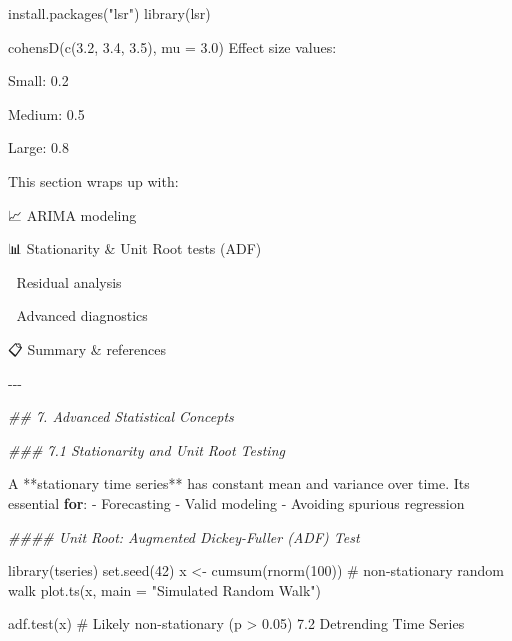 \documentclass[
  letterpaper,
  DIV=11,
  numbers=noendperiod]{scrreprt}
\newenvironment{Shaded}{\begin{snugshade}}{\end{snugshade}}
\newcommand{\AttributeTok}[1]{\textcolor[rgb]{0.40,0.45,0.13}{#1}}
\newcommand{\CommentTok}[1]{\textcolor[rgb]{0.37,0.37,0.37}{#1}}
\newcommand{\ControlFlowTok}[1]{\textcolor[rgb]{0.00,0.23,0.31}{\textbf{#1}}}
\newcommand{\DecValTok}[1]{\textcolor[rgb]{0.68,0.00,0.00}{#1}}
\newcommand{\DocumentationTok}[1]{\textcolor[rgb]{0.37,0.37,0.37}{\textit{#1}}}
\newcommand{\FloatTok}[1]{\textcolor[rgb]{0.68,0.00,0.00}{#1}}
\newcommand{\FunctionTok}[1]{\textcolor[rgb]{0.28,0.35,0.67}{#1}}
\newcommand{\NormalTok}[1]{\textcolor[rgb]{0.00,0.23,0.31}{#1}}
\newcommand{\OtherTok}[1]{\textcolor[rgb]{0.00,0.23,0.31}{#1}}
\newcommand{\SpecialCharTok}[1]{\textcolor[rgb]{0.37,0.37,0.37}{#1}}
\newcommand{\StringTok}[1]{\textcolor[rgb]{0.13,0.47,0.30}{#1}}
\begin{document}
{\begin{Shaded}
\begin{Highlighting}[]
\FunctionTok{install.packages}\NormalTok{(}\StringTok{"lsr"}\NormalTok{)}
\FunctionTok{library}\NormalTok{(lsr)}

\FunctionTok{cohensD}\NormalTok{(}\FunctionTok{c}\NormalTok{(}\FloatTok{3.2}\NormalTok{, }\FloatTok{3.4}\NormalTok{, }\FloatTok{3.5}\NormalTok{), }\AttributeTok{mu =} \FloatTok{3.0}\NormalTok{)}
\NormalTok{Effect size values}\SpecialCharTok{:}

\NormalTok{Small}\SpecialCharTok{:} \FloatTok{0.2}

\NormalTok{Medium}\SpecialCharTok{:} \FloatTok{0.5}

\NormalTok{Large}\SpecialCharTok{:} \FloatTok{0.8}

\NormalTok{This section wraps up with}\SpecialCharTok{:}

\NormalTok{📈 ARIMA modeling}

\NormalTok{📊 Stationarity }\SpecialCharTok{\&}\NormalTok{ Unit Root }\FunctionTok{tests}\NormalTok{ (ADF)}

\NormalTok{🧪 Residual analysis}

\NormalTok{🧠 Advanced diagnostics}

\NormalTok{📋 Summary }\SpecialCharTok{\&}\NormalTok{ references}

\SpecialCharTok{{-}{-}{-}}

\DocumentationTok{\#\# 7. Advanced Statistical Concepts}

\DocumentationTok{\#\#\# 7.1 Stationarity and Unit Root Testing}

\NormalTok{A }\SpecialCharTok{**}\NormalTok{stationary time series}\SpecialCharTok{**}\NormalTok{ has constant mean and variance over time. Its essential }\ControlFlowTok{for}\SpecialCharTok{:}
\SpecialCharTok{{-}}\NormalTok{ Forecasting}
\SpecialCharTok{{-}}\NormalTok{ Valid modeling}
\SpecialCharTok{{-}}\NormalTok{ Avoiding spurious regression}

\DocumentationTok{\#\#\#\# Unit Root: Augmented Dickey{-}Fuller (ADF) Test}

\FunctionTok{library}\NormalTok{(tseries)}
\FunctionTok{set.seed}\NormalTok{(}\DecValTok{42}\NormalTok{)}
\NormalTok{x }\OtherTok{\textless{}{-}} \FunctionTok{cumsum}\NormalTok{(}\FunctionTok{rnorm}\NormalTok{(}\DecValTok{100}\NormalTok{))  }\CommentTok{\# non{-}stationary random walk}
\FunctionTok{plot.ts}\NormalTok{(x, }\AttributeTok{main =} \StringTok{"Simulated Random Walk"}\NormalTok{)}

\FunctionTok{adf.test}\NormalTok{(x)  }\CommentTok{\# Likely non{-}stationary (p \textgreater{} 0.05)}
\FloatTok{7.2}\NormalTok{ Detrending Time Series}


\end{Highlighting}
\end{Shaded}}
\end{document}
